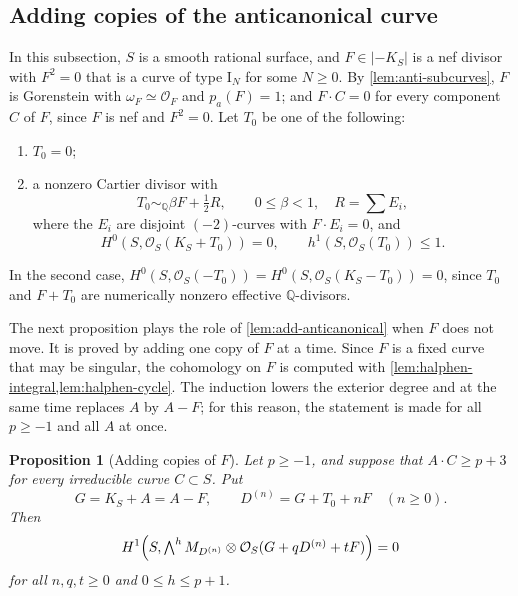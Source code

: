 \documentclass[11pt,reqno]{amsart}
\numberwithin{equation}{section}
\newtheorem{proposition}[proposition]{Proposition}
\theoremstyle{remark}
\newcommand{\sshf}[1]{\mathcal{O}_{#1}}
\newcommand{\pa}{p_a}
\begin{document}
\subsection{Adding copies of the anticanonical curve}\label{sec:add-F}

In this subsection, \(S\) is a smooth rational surface, and \(F\in|-K_S|\) is a nef divisor with \(F^2=0\) that is a curve of type \(\mathrm I_N\) for some \(N\geq0\). By \cref{lem:anti-subcurves}, \(F\) is Gorenstein with \(\omega_F\simeq\sshf{F}\) and \(\pa(F)=1\); and \(F\cdot C=0\) for every component \(C\) of \(F\), since \(F\) is nef and \(F^2=0\). Let \(T_0\) be one of the following:
\begin{enumerate}
\item \(T_0=0\);
\item a nonzero Cartier divisor with
\begin{equation}\label{eq:halphen-small-hypotheses}
 T_0\sim_{\mathbb{Q}}\beta F+\tfrac12R,\qquad 0\leq\beta<1,
 \quad R=\sum E_i,
\end{equation}
where the \(E_i\) are disjoint \((-2)\)-curves with \(F\cdot E_i=0\), and
\begin{equation}\label{eq:halphen-small-cohomology}
 H^0(S,\sshf{S}(K_S+T_0))=0,
 \qquad h^1(S,\sshf{S}(T_0))\leq1.
\end{equation}
\end{enumerate}
In the second case, \(H^0(S,\sshf{S}(-T_0))=H^0(S,\sshf{S}(K_S-T_0))=0\), since \(T_0\) and \(F+T_0\) are numerically nonzero effective \(\mathbb Q\)-divisors.

The next proposition plays the role of \cref{lem:add-anticanonical} when \(F\) does not move. It is proved by adding one copy of \(F\) at a time. Since \(F\) is a fixed curve that may be singular, the cohomology on \(F\) is computed with \cref{lem:halphen-integral,lem:halphen-cycle}. The induction lowers the exterior degree and at the same time replaces \(A\) by \(A-F\); for this reason, the statement is made for all \(p\geq-1\) and all \(A\) at once.

\begin{proposition}[Adding copies of \(F\)]\label{prop:halphen-induction}
Let \(p\geq-1\), and suppose that \(A\cdot C\geq p+3\) for every irreducible curve \(C\subset S\). Put
\[
 G=K_S+A=A-F,\qquad D^{(n)}=G+T_0+nF\quad(n\geq0).
\]
Then
\begin{equation}\label{eq:halphen-inductive-vanishing}
 H^1\Bigl(S,\textstyle\bigwedge^h M_{D^{(n)}}\otimes\sshf{S}(G+qD^{(n)}+tF)\Bigr)=0
\end{equation}
for all \(n,q,t\geq0\) and \(0\leq h\leq p+1\).
\end{proposition}
\end{document}
